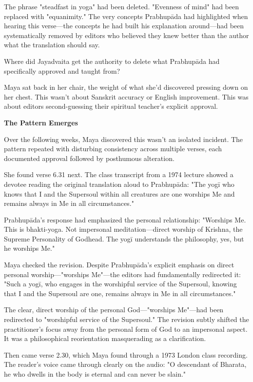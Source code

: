 \documentclass[12pt,twoside]{book}
\begin{document}
The phrase "steadfast in yoga" had been deleted. "Evenness of mind" had been replaced with "equanimity." The very concepts Prabhupāda had highlighted when hearing this verse—the concepts he had built his explanation around—had been systematically removed by editors who believed they knew better than the author what the translation should say.

Where did Jayadvaita get the authority to delete what Prabhupāda had specifically approved and taught from?

Maya sat back in her chair, the weight of what she'd discovered pressing down on her chest. This wasn't about Sanskrit accuracy or English improvement. This was about editors second-guessing their spiritual teacher's explicit approval.


\vspace{0.5cm}
\textbf{The Pattern Emerges}
\vspace{0.2cm}


Over the following weeks, Maya discovered this wasn't an isolated incident. The pattern repeated with disturbing consistency across multiple verses, each documented approval followed by posthumous alteration.

She found verse 6.31 next. The class transcript from a 1974 lecture showed a devotee reading the original translation aloud to Prabhupāda: "The yogī who knows that I and the Supersoul within all creatures are one worships Me and remains always in Me in all circumstances."

Prabhupāda's response had emphasized the personal relationship: "Worships Me. This is bhakti-yoga. Not impersonal meditation—direct worship of Krishna, the Supreme Personality of Godhead. The yogī understands the philosophy, yes, but he worships Me."

Maya checked the revision. Despite Prabhupāda's explicit emphasis on direct personal worship—"worships Me"—the editors had fundamentally redirected it: "Such a yogī, who engages in the worshipful service of the Supersoul, knowing that I and the Supersoul are one, remains always in Me in all circumstances."

The clear, direct worship of the personal God—"worships Me"—had been redirected to "worshipful service of the Supersoul." The revision subtly shifted the practitioner's focus away from the personal form of God to an impersonal aspect. It was a philosophical reorientation masquerading as a clarification.

Then came verse 2.30, which Maya found through a 1973 London class recording. The reader's voice came through clearly on the audio: "O descendant of Bharata, he who dwells in the body is eternal and can never be slain."
\end{document}
